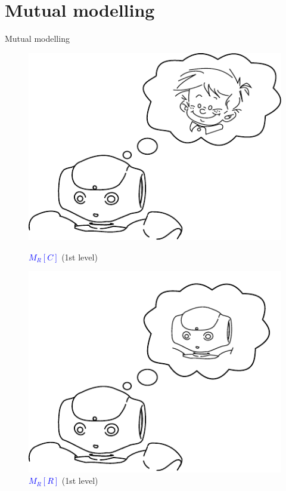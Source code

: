 \documentclass[compress]{beamer}
\begin{document}

\section*{Mutual modelling}


\begin{frame}{Mutual modelling}
\begin{figure}[!tbp]
	\begin{minipage}[b]{.4\textwidth}
		\includegraphics[width=0.8\columnwidth]{naoMM}
		\caption{\textcolor{blue}{$M_R\left[\textit{C}\right]$} (1st level) }
	\end{minipage}
	\hfill
	\begin{minipage}[b]{.4\textwidth}
		\includegraphics[width=0.8\columnwidth]{naoMM4}
		\caption{\textcolor{blue}{$M_R\left[\textit{R}\right]$} (1st level)}
	\end{minipage}

\end{figure}
\end{frame}
\end{document}

